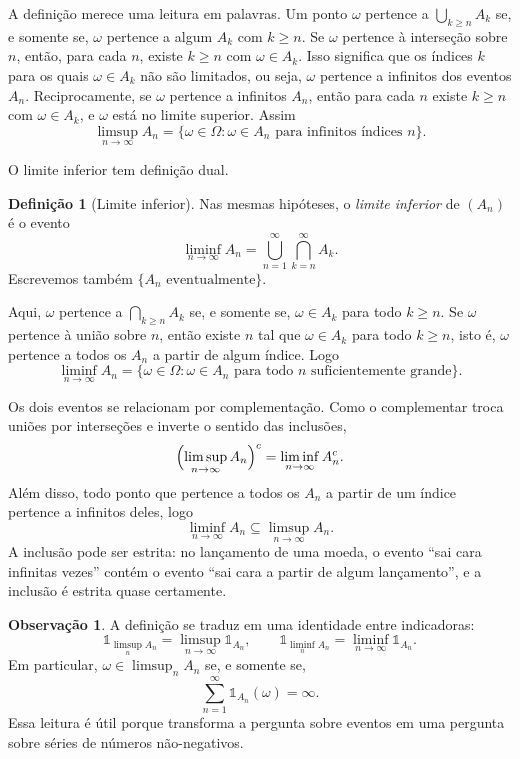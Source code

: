 \documentclass[12pt,portuguese]{article}
\theoremstyle{definition}
\newtheorem{definition}[definition]{Definição}
\newtheorem{remark}[remark]{Observação}
\theoremstyle{plainexercise}
\theoremstyle{starredexercise}
\theoremstyle{definition}
\begin{document}
A definição merece uma leitura em palavras. Um ponto $\omega$ pertence a
$\bigcup_{k\geqslant n}A_k$ se, e somente se, $\omega$ pertence a algum $A_k$
com $k\geqslant n$. Se $\omega$ pertence à interseção sobre $n$, então, para
cada $n$, existe $k\geqslant n$ com $\omega\in A_k$. Isso significa que os
índices $k$ para os quais $\omega\in A_k$ não são limitados, ou seja, $\omega$
pertence a infinitos dos eventos $A_n$. Reciprocamente, se $\omega$ pertence a
infinitos $A_n$, então para cada $n$ existe $k\geqslant n$ com
$\omega\in A_k$, e $\omega$ está no limite superior. Assim
\[
\limsup_{n\to\infty}A_n
=
\{\omega\in\Omega:\omega\in A_n\text{ para infinitos índices }n\}.
\]

O limite inferior tem definição dual.

\begin{definition}[Limite inferior]\label{def:liminf}
Nas mesmas hipóteses, o \emph{limite inferior} de $(A_n)$ é o evento
\[
\liminf_{n\to\infty}A_n
=
\bigcup_{n=1}^{\infty}\bigcap_{k=n}^{\infty}A_k.
\]
Escrevemos também $\{A_n\text{ eventualmente}\}$.
\end{definition}

Aqui, $\omega$ pertence a $\bigcap_{k\geqslant n}A_k$ se, e somente se,
$\omega\in A_k$ para todo $k\geqslant n$. Se $\omega$ pertence à união sobre
$n$, então existe $n$ tal que $\omega\in A_k$ para todo $k\geqslant n$, isto é,
$\omega$ pertence a todos os $A_n$ a partir de algum índice. Logo
\[
\liminf_{n\to\infty}A_n
=
\{\omega\in\Omega:\omega\in A_n\text{ para todo }n\text{ suficientemente grande}\}.
\]

Os dois eventos se relacionam por complementação. Como o complementar troca
uniões por interseções e inverte o sentido das inclusões,
\begin{equation}\label{eq:limsup-complementar}
\Bigl(\limsup_{n\to\infty}A_n\Bigr)^c
=
\liminf_{n\to\infty}A_n^c.
\end{equation}
Além disso, todo ponto que pertence a todos os $A_n$ a partir de um índice
pertence a infinitos deles, logo
\[
\liminf_{n\to\infty}A_n
\subseteq
\limsup_{n\to\infty}A_n.
\]
A inclusão pode ser estrita: no lançamento de uma moeda, o evento ``sai cara
infinitas vezes'' contém o evento ``sai cara a partir de algum lançamento'', e a
inclusão é estrita quase certamente.

\begin{remark}\label{rem:limsup-indicadoras}
A definição se traduz em uma identidade entre indicadoras:
\[
\mathds{1}_{\limsup_n A_n}
=
\limsup_{n\to\infty}\mathds{1}_{A_n},
\qquad
\mathds{1}_{\liminf_n A_n}
=
\liminf_{n\to\infty}\mathds{1}_{A_n}.
\]
Em particular, $\omega\in\limsup_n A_n$ se, e somente se,
\[
\sum_{n=1}^{\infty}\mathds{1}_{A_n}(\omega)=\infty.
\]
Essa leitura é útil porque transforma a pergunta sobre eventos em uma pergunta
sobre séries de números não-negativos.
\end{remark}
\end{document}

